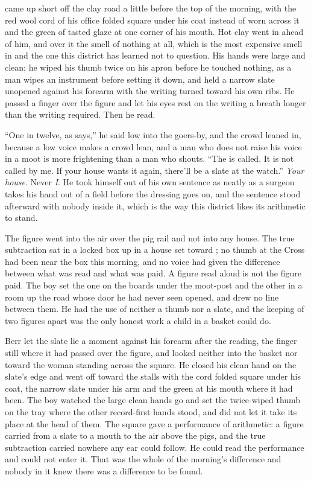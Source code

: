  came up short off the clay road a little before the top of the morning, with the red wool cord of his office folded square under his coat instead of worn across it and the green of tasted glaze at one corner of his mouth. Hot clay went in ahead of him, and over it the smell of nothing at all, which is the most expensive smell in  and the one this district has learned not to question. His hands were large and clean; he wiped his thumb twice on his apron before he touched nothing, as a man wipes an instrument before setting it down, and held a narrow slate unopened against his forearm with the writing turned toward his own ribs. He passed a finger over the figure and let his eyes rest on the writing a breath longer than the writing required. Then he read.

“One in twelve, as  says,” he said low into the goers-by, and the crowd leaned in, because a low voice makes a crowd lean, and a man who does not raise his voice in a moot is more frightening than a man who shouts. “The  is called. It is not called by me. If your house wants it again, there'll be a slate at the watch.” \emph{Your house}. Never \emph{I}. He took himself out of his own sentence as neatly as a surgeon takes his hand out of a field before the dressing goes on, and the sentence stood afterward with nobody inside it, which is the way this district likes its arithmetic to stand.

The figure went into the air over the pig rail and not into any house. The true subtraction sat in a locked box up  in a house set toward ; no thumb at the Cross had been near the box this morning, and no voice had given the difference between what was read and what was paid. A figure read aloud is not the figure paid. The boy set the one on the boards under the moot-post and the other in a room up the road whose door he had never seen opened, and drew no line between them. He had the use of neither a thumb nor a slate, and the keeping of two figures apart was the only honest work a child in a basket could do.

Berr let the slate lie a moment against his forearm after the reading, the finger still where it had passed over the figure, and looked neither into the basket nor toward the woman standing across the square. He closed his clean hand on the slate's edge and went off toward the stalls with the cord folded square under his coat, the narrow slate under his arm and the green at his mouth where it had been. The boy watched the large clean hands go and set the twice-wiped thumb on the tray where the other record-first hands stood, and did not let it take its place at the head of them. The square gave a performance of arithmetic: a figure carried from a slate to a mouth to the air above the pigs, and the true subtraction carried nowhere any ear could follow. He could read the performance and could not enter it. That was the whole of the morning's difference and nobody in it knew there was a difference to be found.

